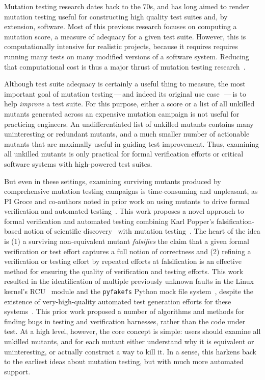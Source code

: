 Mutation testing research dates back to the 70s, and has long aimed to render
mutation testing useful for constructing high quality
test suites and, by extension, software.
Most of this previous
research focuses on computing a mutation score, a measure of adequacy for a
given test suite.  However, this is computationally intensive for realistic
projects, because it requires requires running many tests on many modified
versions of a software system.  Reducing that computational cost is thus a major
thrust of mutation testing research~\cite{jia2011analysis}.

Although test suite adequacy is certainly a useful thing to measure, the most
important goal of mutation testing\,---\,and indeed its original use
case~\cite{budd1980theoretical}\,---\,is to help \emph{improve} a test suite.  For this
purpose, either a score or a list of all unkilled mutants generated across an
expensive mutation campaign is not useful for practicing engineers.  An
undifferentiated list of unkilled mutants contains many uninteresting or
redundant mutants, and a much smaller number of actionable mutants that are
maximally useful in guiding test improvement.  Thus, examining all unkilled
mutants is only practical for formal verification efforts or critical software
systems with high-powered test suites.

But even in these settings, examining
surviving mutants produced by comprehensive mutation testing campaigns is
time-consuming and unpleasant, as PI Groce and co-authors noted in prior work on
using mutants to drive formal verification and automated
testing~\cite{groce2015verified,groce2018verified,mutKernel}.
%
This work proposes a novel approach to
formal verification and automated testing
combining Karl Popper's falsification-based notion of
scientific discovery~\cite{Popper,popperconjectures} with mutation
testing~\cite{groce2015verified,groce2018verified,mutKernel}.
The heart of the idea is (1) a surviving non-equivalent mutant
\emph{falsifies} the claim that a given
formal verification or test effort captures a full notion of
correctness and (2) refining a
verification or testing effort by repeated efforts at falsification is an
effective method for ensuring the quality of verification and testing
efforts.  This
work resulted in the identification of multiple previously unknown faults in
the Linux kernel's
RCU~\cite{MathieuDesnoyers2012URCU,DinakarGuniguntala2008IBMSysJ,McKenney:2013:SDS:2483852.2483867}
module and the {\tt pyfakefs} Python mock file
system~\cite{pyfakefs}, despite the existence of very-high-quality
automated test generation efforts for these
systems~\cite{rcutorture,TSTL}.  This prior work
proposed a number of algorithms and
methods for finding bugs in testing and verification
harnesses, rather than the code under test.  At a high level, however,
the core concept is simple:  users should examine all unkilled
mutants, and for each mutant either understand why it is
equivalent or uninteresting, or actually construct a way to kill it.  In a sense, this harkens back to the
earliest ideas about mutation testing, but with
much more automated support.

